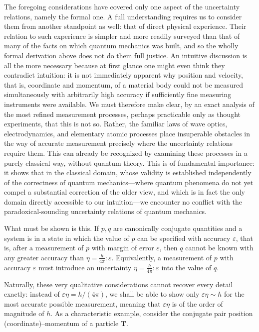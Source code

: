 \documentclass[fontsize=13pt,twoside,openany,headings=normal,parskip=false,bookmarkpackage=false,DIV=calc]{scrbook}
\begin{document}
The foregoing considerations have covered only one aspect of the uncertainty relations, namely the formal one. A full understanding requires us to consider them from another standpoint as well: that of direct physical experience. Their relation to such experience is simpler and more readily surveyed than that of many of the facts on which quantum mechanics was built, and so the wholly formal derivation above does not do them full justice. An intuitive discussion is all the more necessary because at first glance one might even think they contradict intuition: it is not immediately apparent why position and velocity, that is,
\hypertarget{origpage-126}{}%
coordinate and momentum, of a material body could not be measured simultaneously with arbitrarily high accuracy if sufficiently fine measuring instruments were available. We must therefore make clear, by an exact analysis of the most refined measurement processes, perhaps practicable only as thought experiments, that this is not so. Rather, the familiar laws of wave optics, electrodynamics, and elementary atomic processes place insuperable obstacles in the way of accurate measurement precisely where the uncertainty relations require them. This can already be recognized by examining these processes in a purely classical way, without quantum theory. This is of fundamental importance: it shows that in the classical domain, whose validity is established independently of the correctness of quantum mechanics---where quantum phenomena do not yet compel a substantial correction of the older view, and which is in fact the only domain directly accessible to our intuition---we encounter no conflict with the paradoxical-sounding uncertainty relations of quantum mechanics.

What must be shown is this. If $p,q$ are canonically conjugate quantities and a system is in a state in which the value of $p$ can be specified with accuracy $\varepsilon$, that is, after a measurement of $p$ with margin of error $\varepsilon$, then $q$ cannot be known with any greater accuracy than $\eta=\frac h{4\pi}:\varepsilon$. Equivalently, a measurement of $p$ with accuracy $\varepsilon$ must introduce an uncertainty $\eta=\frac h{4\pi}:\varepsilon$ into the value of $q$.

Naturally, these very qualitative considerations cannot recover every detail exactly: instead of $\varepsilon\eta=h/(4\pi)$, we shall be able to show only $\varepsilon\eta\sim h$ for the most accurate possible measurement, meaning that $\varepsilon\eta$ is of the order of magnitude of $h$. As a characteristic example, consider the conjugate pair position (coordinate)--momentum of a particle $\boldsymbol{T}$.
\end{document}
